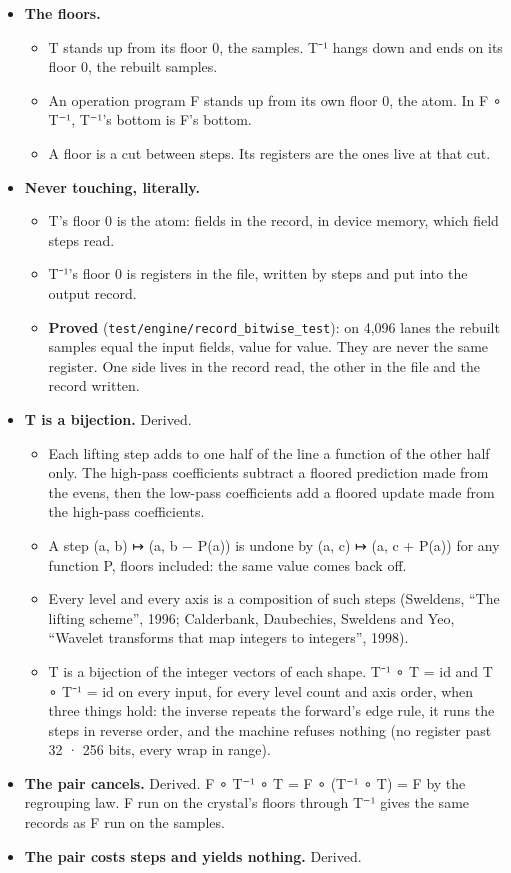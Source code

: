 \begin{itemize}
\item \textbf{The floors.}

\begin{itemize}
\item T stands up from its floor 0, the samples. T⁻¹ hangs down and ends on its floor 0, the rebuilt samples.
\item An operation program F stands up from its own floor 0, the atom. In F ∘ T⁻¹, T⁻¹'s bottom is F's bottom.
\item A floor is a cut between steps. Its registers are the ones live at that cut.
\end{itemize}
\item \textbf{Never touching, literally.}

\begin{itemize}
\item T's floor 0 is the atom: fields in the record, in device memory, which field steps read.
\item T⁻¹'s floor 0 is registers in the file, written by steps and put into the output record.
\item \textbf{Proved} (\texttt{test/\allowbreak{}engine/\allowbreak{}record\_\allowbreak{}bitwise\_\allowbreak{}test}): on 4,096 lanes the rebuilt samples equal the input fields, value for value. They are never the same register. One side lives in the record read, the other in the file and the record written.
\end{itemize}
\item \textbf{T is a bijection.} Derived.

\begin{itemize}
\item Each lifting step adds to one half of the line a function of the other half only. The high-pass coefficients subtract a floored prediction made from the evens, then the low-pass coefficients add a floored update made from the high-pass coefficients.
\item A step (a, b) ↦ (a, b − P(a)) is undone by (a, c) ↦ (a, c + P(a)) for any function P, floors included: the same value comes back off.
\item Every level and every axis is a composition of such steps (Sweldens, “The lifting scheme”, 1996; Calderbank, Daubechies, Sweldens and Yeo, “Wavelet transforms that map integers to integers”, 1998).
\item T is a bijection of the integer vectors of each shape. T⁻¹ ∘ T = id and T ∘ T⁻¹ = id on every input, for every level count and axis order, when three things hold: the inverse repeats the forward's edge rule, it runs the steps in reverse order, and the machine refuses nothing (no register past 32 · 256 bits, every wrap in range).
\end{itemize}
\item \textbf{The pair cancels.} Derived. F ∘ T⁻¹ ∘ T = F ∘ (T⁻¹ ∘ T) = F by the regrouping law. F run on the crystal's floors through T⁻¹ gives the same records as F run on the samples.
\item \textbf{The pair costs steps and yields nothing.} Derived.


\end{itemize}
